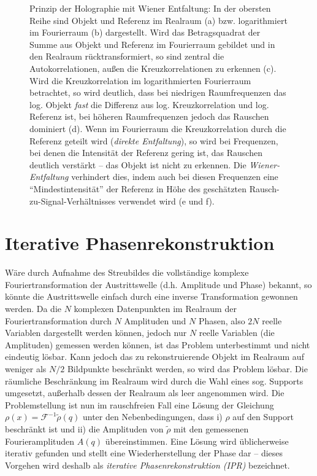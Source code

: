 \begin{figure}
	\centering
	\caption[Prinzip Enfaltung]{Prinzip der Holographie mit  Wiener Entfaltung: In der obersten Reihe sind Objekt und Referenz im Realraum (a) bzw. logarithmiert im Fourierraum (b) dargestellt. Wird das Betragsquadrat der Summe aus Objekt und Referenz im Fourierraum gebildet und in den Realraum rücktransformiert, so sind zentral die Autokorrelationen, außen die Kreuzkorrelationen zu erkennen (c). Wird die Kreuzkorrelation im logarithmierten Fourierraum betrachtet, so wird deutlich, dass bei niedrigen Raumfrequenzen das log. Objekt \textit{fast} die Differenz aus log. Kreuzkorrelation und log. Referenz ist, bei höheren Raumfrequenzen jedoch das Rauschen dominiert (d). Wenn im Fourierraum die Kreuzkorrelation durch die Referenz geteilt wird (\textit{direkte Entfaltung}), so wird bei Frequenzen, bei denen die Intensität der Referenz gering ist, das Rauschen deutlich verstärkt -- das Objekt ist nicht zu erkennen. Die \textit{Wiener-Entfaltung} verhindert dies, indem auch bei diesen Frequenzen eine "`Mindestintensität"' der Referenz in Höhe des geschätzten Rausch-zu-Signal-Verhältnisses verwendet wird (e und f). }
	\label{fig:wiener}
\end{figure} 

\section{Iterative Phasenrekonstruktion}
Wäre durch Aufnahme des Streubildes die vollständige komplexe Fouriertransformation der Austrittswelle (d.h. Amplitude und Phase) bekannt, so könnte die Austrittswelle einfach durch eine inverse Transformation gewonnen werden. Da die $N$ komplexen Datenpunkten im Realraum der Fouriertransformation durch $N$ Amplituden und $N$ Phasen, also $2N$ reelle Variablen dargestellt werden können, jedoch nur $N$ reelle Variablen (die Amplituden) gemessen werden können, ist das Problem unterbestimmt und nicht eindeutig lösbar. Kann jedoch das zu rekonstruierende Objekt im Realraum auf weniger als $N/2$ Bildpunkte beschränkt werden, so wird das Problem lösbar. Die räumliche Beschränkung im Realraum wird durch die Wahl eines sog. Supports umgesetzt, außerhalb dessen der Realraum als leer angenommen wird.  
Die Problemstellung ist nun im rauschfreien Fall eine Lösung der Gleichung $\rho(x)=\mathscr{F}^{-1}\tilde{\rho}(q)$ unter den Nebenbedingungen, dass i) $\rho$ auf den Support beschränkt ist und ii) die Amplituden von $\tilde{\rho}$ mit den gemessenen Fourieramplituden $A(q)$ übereinstimmen. Eine Lösung wird üblicherweise iterativ gefunden und stellt eine Wiederherstellung der Phase dar -- dieses Vorgehen wird deshalb als \textit{iterative Phasenrekonstruktion (IPR)} bezeichnet.
